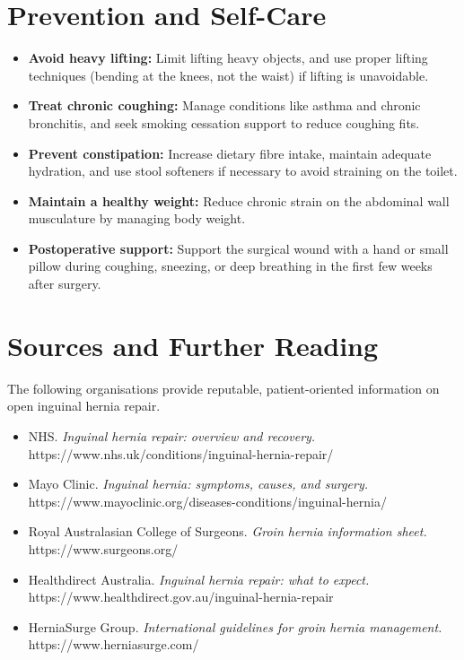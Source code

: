 \section*{Prevention and Self-Care}
\begin{itemize}
    \item \textbf{Avoid heavy lifting:} Limit lifting heavy objects, and use proper lifting techniques (bending at the knees, not the waist) if lifting is unavoidable.
    \item \textbf{Treat chronic coughing:} Manage conditions like asthma and chronic bronchitis, and seek smoking cessation support to reduce coughing fits.
    \item \textbf{Prevent constipation:} Increase dietary fibre intake, maintain adequate hydration, and use stool softeners if necessary to avoid straining on the toilet.
    \item \textbf{Maintain a healthy weight:} Reduce chronic strain on the abdominal wall musculature by managing body weight.
    \item \textbf{Postoperative support:} Support the surgical wound with a hand or small pillow during coughing, sneezing, or deep breathing in the first few weeks after surgery.
\end{itemize}

\section*{Sources and Further Reading}
The following organisations provide reputable, patient-oriented information on open inguinal hernia repair.
\begin{itemize}
    \item NHS. \textit{Inguinal hernia repair: overview and recovery.} https://www.nhs.uk/conditions/inguinal-hernia-repair/
    \item Mayo Clinic. \textit{Inguinal hernia: symptoms, causes, and surgery.} https://www.mayoclinic.org/diseases-conditions/inguinal-hernia/
    \item Royal Australasian College of Surgeons. \textit{Groin hernia information sheet.} https://www.surgeons.org/
    \item Healthdirect Australia. \textit{Inguinal hernia repair: what to expect.} https://www.healthdirect.gov.au/inguinal-hernia-repair
    \item HerniaSurge Group. \textit{International guidelines for groin hernia management.} https://www.herniasurge.com/
\end{itemize}
